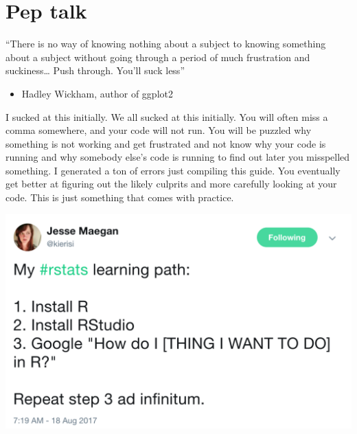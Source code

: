 \documentclass[
  letterpaper,
  DIV=11,
  numbers=noendperiod,
  oneside]{scrreprt}
\providecommand{\tightlist}{%
  \setlength{\itemsep}{0pt}\setlength{\parskip}{0pt}}\usepackage{longtable,booktabs,array}
\begin{document}

\hypertarget{pep-talk}{%
\chapter*{Pep talk}\label{pep-talk}}


\begin{tcolorbox}[enhanced jigsaw, breakable, opacitybacktitle=0.6, colframe=quarto-callout-important-color-frame, bottomrule=.15mm, opacityback=0, toprule=.15mm, coltitle=black, toptitle=1mm, colback=white, titlerule=0mm, bottomtitle=1mm, colbacktitle=quarto-callout-important-color!10!white, title=\textcolor{quarto-callout-important-color}{\faExclamation}\hspace{0.5em}{Important}, rightrule=.15mm, arc=.35mm, leftrule=.75mm, left=2mm]

``There is no way of knowing nothing about a subject to knowing
something about a subject without going through a period of much
frustration and suckiness\ldots{} Push through. You'll suck less''

\begin{itemize}
\tightlist
\item
  Hadley Wickham, author of ggplot2
\end{itemize}

\end{tcolorbox}

I sucked at this initially. We all sucked at this initially. You will
often miss a comma somewhere, and your code will not run. You will be
puzzled why something is not working and get frustrated and not know why
your code is running and why somebody else's code is running to find out
later you misspelled something. I generated a ton of errors just
compiling this guide. You eventually get better at figuring out the
likely culprits and more carefully looking at your code. This is just
something that comes with practice.

\includegraphics[width=5.89in,height=\textheight]{figs/learning-r.png}
\end{document}
